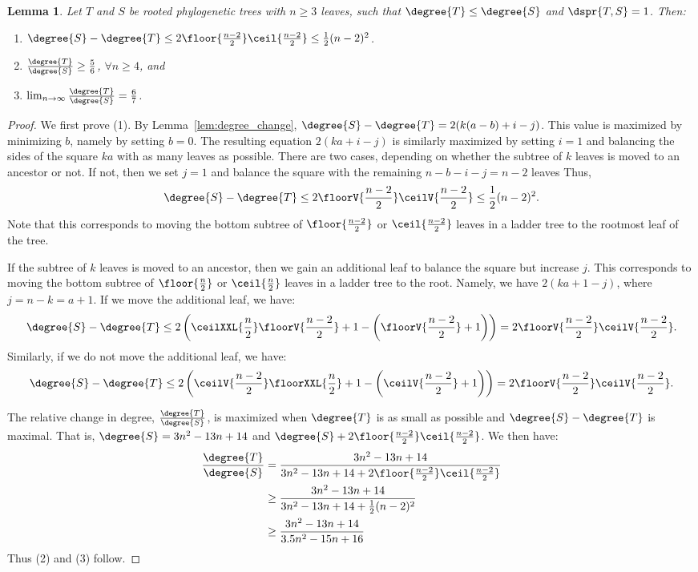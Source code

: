 \documentclass{amsart}
\newtheorem{lemma}[theorem]{Lemma}
\begin{document}
\begin{lemma}
	\label{lem:degree_max_delta_adjacent}
	Let $T$ and $S$ be rooted phylogenetic trees with $n \ge 3$ leaves, such that $\degree{T} \le \degree{S}$ and $\dspr{T,S} = 1$.
	Then:
	\begin{enumerate}
		\item $\degree{S} - \degree{T} \le 2\floor{\frac{n-2}{2}}\ceil{\frac{n-2}{2}} \le \frac{1}{2} (n-2)^2 $.
		\item $\frac{\degree{T}}{\degree{S}} \ge \frac{5}{6}$, $\forall n \ge 4$, and
		\item $\lim_{n\rightarrow\infty}\frac{\degree{T}}{\degree{S}} =  \frac{6}{7}$.
	\end{enumerate}
\end{lemma}
\begin{proof}
	We first prove (1).
	By Lemma~\ref{lem:degree_change}, $\degree{S} - \degree{T} = 2(k(a-b) + i - j)$.
	This value is maximized by minimizing $b$, namely by setting $b=0$.
	The resulting equation $2(ka + i - j)$ is similarly maximized by setting $i=1$ and balancing the sides of the square $ka$ with as many leaves as possible.
	There are two cases, depending on whether the subtree of $k$ leaves is moved to an ancestor or not. If not, then we set $j=1$ and balance the square with the remaining $n-b-i-j = n-2$ leaves
	Thus, $$\degree{S} - \degree{T} \le 2\floorV{\frac{n-2}{2}}\ceilV{\frac{n-2}{2}} \le \frac{1}{2} (n-2)^2.$$
	Note that this corresponds to moving the bottom subtree of $\floor{\frac{n-2}{2}}$ or $\ceil{\frac{n-2}{2}}$ leaves in a ladder tree to the rootmost leaf of the tree.

	If the subtree of $k$ leaves is moved to an ancestor, then we gain an additional leaf to balance the square but increase $j$.
	This corresponds to moving the bottom subtree of $\floor{\frac{n}{2}}$ or $\ceil{\frac{n}{2}}$ leaves in a ladder tree to the root.
	Namely, we have $2(ka + 1 - j)$, where $j = n - k = a + 1$.
	If we move the additional leaf, we have:
$$\degree{S} - \degree{T} \le 2\left(\ceilXXL{\frac{n}{2}}\floorV{\frac{n-2}{2}}  + 1 - \left(\floorV{\frac{n-2}{2}} + 1\right)\right) = 2\floorV{\frac{n-2}{2}}\ceilV{\frac{n-2}{2}}.$$
Similarly, if we do not move the additional leaf, we have:
$$\degree{S} - \degree{T} \le 2 \left(\ceilV{\frac{n-2}{2}}\floorXXL{\frac{n}{2}} +1 -  \left(\ceilV{\frac{n-2}{2}} + 1\right)\right) = 2\floorV{\frac{n-2}{2}}\ceilV{\frac{n-2}{2}}.$$

	The relative change in degree, $\frac{\degree{T}}{\degree{S}}$, is maximized when $\degree{T}$ is as small as possible and $\degree{S} - \degree{T}$ is maximal.
	That is, $\degree{S} = 3n^2 - 13n + 14$ and $\degree{S} + 2\floor{\frac{n-2}{2}} \ceil{\frac{n-2}{2}}$.
	We then have:
	\begin{align}
		\frac{\degree{T}}{\degree{S}} &= \frac{3n^2 - 13n + 14}{3n^2 - 13n + 14 + 2\floor{\frac{n-2}{2}} \ceil{\frac{n-2}{2}}} \\
		&\ge \frac{3n^2 - 13n + 14}{3n^2 - 13n + 14 + \frac{1}{2}(n-2)^2} \\
		&\ge \frac{3n^2 - 13n + 14}{3.5n^2 - 15n + 16}
	\end{align}
	Thus (2) and (3) follow.

\end{proof}
\end{document}
